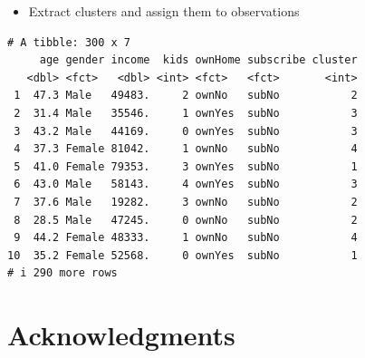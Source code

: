 \documentclass[
  ignorenonframetext,
]{beamer}
\newenvironment{Shaded}{\begin{snugshade}}{\end{snugshade}}
\newcommand{\AttributeTok}[1]{\textcolor[rgb]{0.40,0.45,0.13}{#1}}
\newcommand{\FunctionTok}[1]{\textcolor[rgb]{0.28,0.35,0.67}{#1}}
\newcommand{\NormalTok}[1]{\textcolor[rgb]{0.00,0.23,0.31}{#1}}
\newcommand{\OtherTok}[1]{\textcolor[rgb]{0.00,0.23,0.31}{#1}}
\newcommand{\SpecialCharTok}[1]{\textcolor[rgb]{0.37,0.37,0.37}{#1}}
\providecommand{\tightlist}{%
  \setlength{\itemsep}{0pt}\setlength{\parskip}{0pt}}\usepackage{longtable,booktabs,array}
\begin{document}
\begin{frame}[fragile]{}
\label{section-49}
\begin{itemize}
\tightlist
\item
  Extract clusters and assign them to observations
\end{itemize}

\tiny

\begin{Shaded}
\end{Shaded}

\begin{verbatim}
# A tibble: 300 x 7
     age gender income  kids ownHome subscribe cluster
   <dbl> <fct>   <dbl> <int> <fct>   <fct>       <int>
 1  47.3 Male   49483.     2 ownNo   subNo           2
 2  31.4 Male   35546.     1 ownYes  subNo           3
 3  43.2 Male   44169.     0 ownYes  subNo           3
 4  37.3 Female 81042.     1 ownNo   subNo           4
 5  41.0 Female 79353.     3 ownYes  subNo           1
 6  43.0 Male   58143.     4 ownYes  subNo           3
 7  37.6 Male   19282.     3 ownNo   subNo           2
 8  28.5 Male   47245.     0 ownNo   subNo           2
 9  44.2 Female 48333.     1 ownNo   subNo           4
10  35.2 Female 52568.     0 ownYes  subNo           1
# i 290 more rows
\end{verbatim}
\end{frame}

\section{Acknowledgments}\label{acknowledgments}
\end{document}
